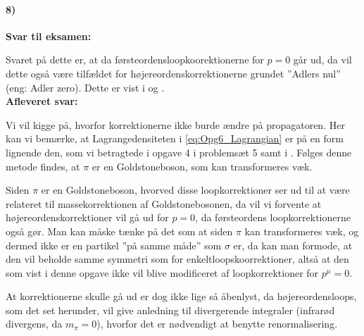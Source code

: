 \documentclass[../main.tex]{subfiles}
\begin{document}

\paragraph[8) Højereordens loopkorrektioner og $\pi$-propagatoren]{\textbf{8)}}


\textbf{Svar til eksamen:}

Svaret på dette er, at da førsteordensloopkoorektionerne for $p = 0$ går ud, da vil dette også være tilfældet for højereordenskorrektionerne grundet ''Adlers nul'' (eng: Adler zero). Dette er vist i \cite[s. 175]{Weinberg} og \cite{PhysRevLett.124.111601}.
\\


\textbf{Afleveret svar:}

Vi vil kigge på, hvorfor korrektionerne ikke burde ændre på propagatoren. Her kan vi bemærke, at Lagrangedensiteten i \cref{eq:Opg6_Lagrangian} er på en form lignende den, som vi betragtede i opgave 4 i problemsæt 5 \cite[opg. 4]{problemSet5} samt i \cite[kap. 10.8]{griffiths_IntroductionToElementaryParticles}. Følges denne metode findes, at $\pi$ er en Goldstoneboson, som kan transformeres væk.

Siden $\pi$ er en Goldstoneboson, hvorved disse loopkorrektioner ser ud til at være relateret til massekorrektionen af Goldstonebosonen, da vil vi forvente at højereordenskorrektioner vil gå ud for $p = 0$, da førsteordens loopkorrektionerne også gør. Man kan måske tænke på det som at siden $\pi$ kan transformeres væk, og dermed ikke er en partikel ''på samme måde'' som $\sigma$ er, da kan man formode, at den vil beholde samme symmetri som for enkeltloopskoorrektioner, altså at den som vist i denne opgave ikke vil blive modificeret af loopkorrektioner for $p^\mu = 0$.


At korrektionerne skulle gå ud er dog ikke lige så åbenlyst, da højereordensloops, som det set herunder, vil give anledning til divergerende integraler (infrarød divergens, da $m_\pi = 0$), hvorfor det er nødvendigt at benytte renormalisering.
\end{document}
